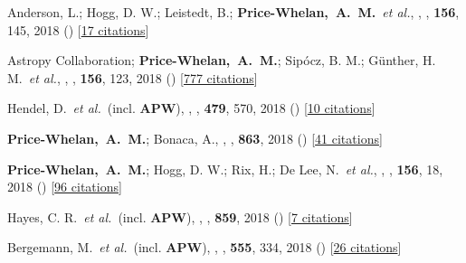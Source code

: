 \item[{\color{deemph}\scriptsize44}]Anderson, L.; Hogg, D. W.; Leistedt, B.; \textbf{Price-Whelan,~A.~M.}~\textit{et al.}, , \aj, \textbf{156}, 145, 2018 () [\href{http://adsabs.harvard.edu/abs/2018AJ....156..145A}{17 citations}]

\item[{\color{deemph}\scriptsize43}]Astropy Collaboration; \textbf{Price-Whelan,~A.~M.}; Sip{\'{o}}cz, B. M.; G{\"u}nther, H. M.~\textit{et al.}, , \aj, \textbf{156}, 123, 2018 () [\href{http://adsabs.harvard.edu/abs/2018AJ....156..123A}{777 citations}]

\item[{\color{deemph}\scriptsize42}]Hendel, D.~\textit{et al.}~(incl. \textbf{APW}), , \mnras, \textbf{479}, 570, 2018 () [\href{http://adsabs.harvard.edu/abs/2018MNRAS.479..570H}{10 citations}]

\item[{\color{deemph}\scriptsize41}]\textbf{Price-Whelan,~A.~M.}; Bonaca, A., , \apj, \textbf{863}, 2018 () [\href{http://adsabs.harvard.edu/abs/2018ApJ...863L..20P}{41 citations}]

\item[{\color{deemph}\scriptsize40}]\textbf{Price-Whelan,~A.~M.}; Hogg, D. W.; Rix, H.; De Lee, N.~\textit{et al.}, , \aj, \textbf{156}, 18, 2018 () [\href{http://adsabs.harvard.edu/abs/2018AJ....156...18P}{96 citations}]

\item[{\color{deemph}\scriptsize39}]Hayes, C. R.~\textit{et al.}~(incl. \textbf{APW}), , \apj, \textbf{859}, 2018 () [\href{http://adsabs.harvard.edu/abs/2018ApJ...859L...8H}{7 citations}]

\item[{\color{deemph}\scriptsize38}]Bergemann, M.~\textit{et al.}~(incl. \textbf{APW}), , \nature, \textbf{555}, 334, 2018 () [\href{http://adsabs.harvard.edu/abs/2018Natur.555..334B}{26 citations}]

